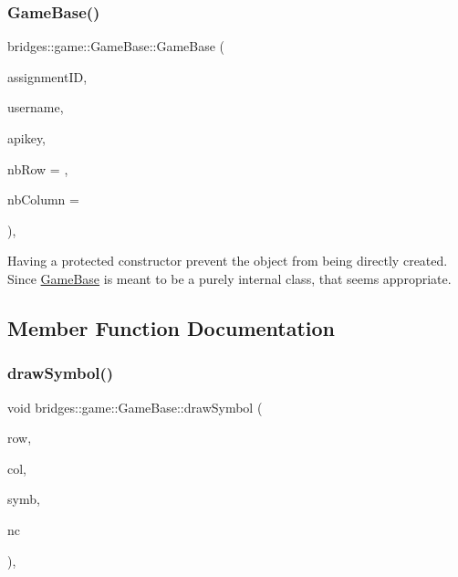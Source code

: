 \subsubsection{\texorpdfstring{GameBase()}{GameBase()}}
{\footnotesize\ttfamily bridges\+::game\+::\+Game\+Base\+::\+Game\+Base (\begin{DoxyParamCaption}\item[{int}]{assignment\+ID,  }\item[{std\+::string}]{username,  }\item[{std\+::string}]{apikey,  }\item[{int}]{nb\+Row = {},  }\item[{int}]{nb\+Column = {} }\end{DoxyParamCaption})\hspace{0.3cm}{\ttfamily [inline]}, {\ttfamily [protected]}}

Having a protected constructor prevent the object from being directly created. Since \mbox{\hyperlink{classbridges_1_1game_1_1_game_base}{Game\+Base}} is meant to be a purely internal class, that seems appropriate. 

\subsection{Member Function Documentation}
\mbox{\label{classbridges_1_1game_1_1_game_base_a415fa8f70bef364dfa966f2a86048901}} 
\subsubsection{\texorpdfstring{drawSymbol()}{drawSymbol()}}
{\footnotesize\ttfamily void bridges\+::game\+::\+Game\+Base\+::draw\+Symbol (\begin{DoxyParamCaption}\item[{int}]{row,  }\item[{int}]{col,  }\item[{\mbox{\hyperlink{namespacebridges_1_1game_ab9a19c7ab6e2ebac2f95180e21733487}{Named\+Symbol}}}]{symb,  }\item[{\mbox{\hyperlink{namespacebridges_1_1game_afaa832a4322b25b6a4ebfba832f10f26}{Named\+Color}}}]{nc }\end{DoxyParamCaption})\hspace{0.3cm}{\ttfamily [inline]}, {\ttfamily [protected]}}



